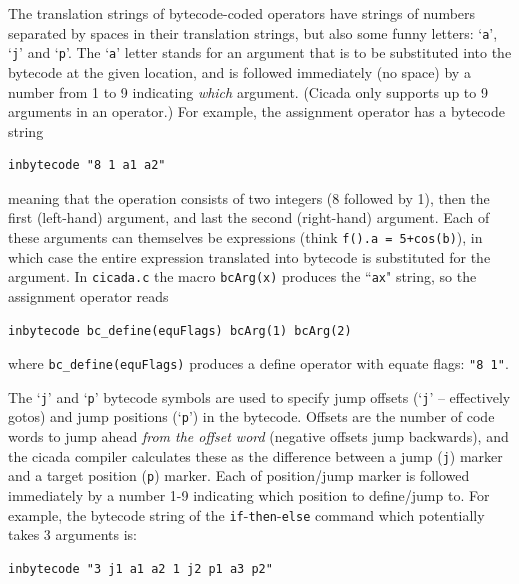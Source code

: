 \documentclass{article}
\newenvironment{code}{
       \begin{list}{}{
               \setlength{\leftmargin}{.4in}
               \setlength{\rightmargin}{0in}
               \setlength{\topsep}{.2in}
       }
       \small
       \item[] }
       { \end{list}   }
\begin{document}
The translation strings of bytecode-coded operators have strings of numbers separated by spaces in their translation strings, but also some funny letters:  `\verb#a#', `\verb#j#' and `\verb#p#'.  The `\verb#a#' letter stands for an argument that is to be substituted into the bytecode at the given location, and is followed immediately (no space) by a number from 1 to 9 indicating \emph{which} argument.  (Cicada only supports up to 9 arguments in an operator.)  For example, the assignment operator has a bytecode string

\begin{code} \begin{verbatim}
inbytecode "8 1 a1 a2"
\end{verbatim} \end{code}

\noindent meaning that the operation consists of two integers (8 followed by 1), then the first (left-hand) argument, and last the second (right-hand) argument.  Each of these arguments can themselves be expressions (think \verb#f().a = 5+cos(b)#), in which case the entire expression translated into bytecode is substituted for the argument.  In \verb#cicada.c# the macro \verb#bcArg(x)# produces the ``\verb#ax#" string, so the assignment operator reads

\begin{code} \begin{verbatim}
inbytecode bc_define(equFlags) bcArg(1) bcArg(2)
\end{verbatim} \end{code}

\noindent where \verb#bc_define(equFlags)# produces a define operator with equate flags:  \verb#"8 1"#.

The `\verb#j#' and `\verb#p#' bytecode symbols are used to specify jump offsets (`\verb#j#' -- effectively gotos) and jump positions (`\verb#p#') in the bytecode.  Offsets are the number of code words to jump ahead \emph{from the offset word} (negative offsets jump backwards), and the cicada compiler calculates these as the difference between a jump (\verb#j#) marker and a target position (\verb#p#) marker.  Each of position/jump marker is followed immediately by a number 1-9 indicating which position to define/jump to.  For example, the bytecode string of the \verb#if#-\verb#then#-\verb#else# command which potentially takes 3 arguments is:

\begin{code} \begin{verbatim}
inbytecode "3 j1 a1 a2 1 j2 p1 a3 p2"
\end{verbatim} \end{code}
\end{document}
